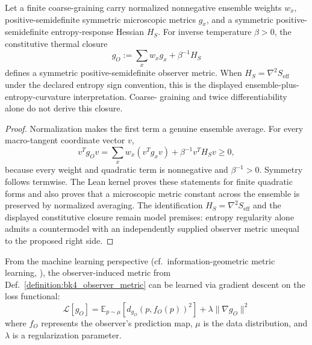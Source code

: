 \begin{lemma}\label{lemma:bk4_statistical_mechanics}
Let a finite coarse-graining carry normalized nonnegative ensemble weights
$w_x$, positive-semidefinite symmetric microscopic metrics $g_x$, and a
symmetric positive-semidefinite entropy-response Hessian $H_S$.  For inverse
temperature $\beta>0$, the constitutive thermal closure
\begin{equation}
 g_O:=\sum_x w_xg_x+\beta^{-1}H_S
\end{equation}
defines a symmetric positive-semidefinite observer metric.  When
$H_S=\nabla^2S_{\mathrm{eff}}$ under the declared entropy sign convention, this
is the displayed ensemble-plus-entropy-curvature interpretation.  Coarse-
graining and twice differentiability alone do not derive this closure.
\end{lemma}
\begin{proof}
\label{proof:bk4_statistical_mechanics}
Normalization makes the first term a genuine ensemble average. For every
macro-tangent coordinate vector $v$,
\[
 v^Tg_Ov=\sum_xw_x(v^Tg_xv)+\beta^{-1}v^TH_Sv\geq0,
\]
because every weight and quadratic term is nonnegative and $\beta^{-1}>0$.
Symmetry follows termwise. The Lean kernel proves these statements for finite
quadratic forms and also proves that a microscopic metric constant across the
ensemble is preserved by normalized averaging. The identification
$H_S=\nabla^2S_{\mathrm{eff}}$ and the displayed constitutive closure remain
model premises: entropy regularity alone admits a countermodel with an
independently supplied observer metric unequal to the proposed right side.
\end{proof}

\begin{theorem}\label{theorem:bk4_ml_metric_learning}
From the machine learning perspective (cf.~information-geometric metric learning, \citealp{amari2000}), the observer-induced metric from Def.~\ref{definition:bk4_observer_metric} can be learned via gradient descent on the loss functional:
\begin{equation}
    \mathcal{L}[g_O] = \mathbb{E}_{p \sim \mu} \left[ d_{g_O}(p, f_O(p))^2 \right] + \lambda \|\nabla g_O\|^2
\end{equation}
where $f_O$ represents the observer's prediction map, $\mu$ is the data distribution, and $\lambda$ is a regularization parameter.
\end{theorem}

